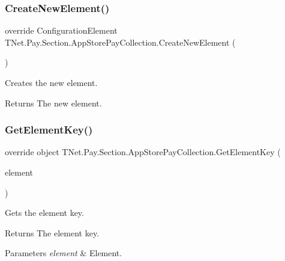 \subsubsection{\texorpdfstring{Create\+New\+Element()}{CreateNewElement()}}
{\footnotesize\ttfamily override Configuration\+Element T\+Net.\+Pay.\+Section.\+App\+Store\+Pay\+Collection.\+Create\+New\+Element (\begin{DoxyParamCaption}{ }\end{DoxyParamCaption})\hspace{0.3cm}{\ttfamily [protected]}}



Creates the new element. 

\begin{DoxyReturn}{Returns}
The new element.
\end{DoxyReturn}
\mbox{\label{class_t_net_1_1_pay_1_1_section_1_1_app_store_pay_collection_a2009b8860cf11f12d439bd89bd09663a}} 
\subsubsection{\texorpdfstring{Get\+Element\+Key()}{GetElementKey()}}
{\footnotesize\ttfamily override object T\+Net.\+Pay.\+Section.\+App\+Store\+Pay\+Collection.\+Get\+Element\+Key (\begin{DoxyParamCaption}\item[{Configuration\+Element}]{element }\end{DoxyParamCaption})\hspace{0.3cm}{\ttfamily [protected]}}



Gets the element key. 

\begin{DoxyReturn}{Returns}
The element key.
\end{DoxyReturn}

\begin{DoxyParams}{Parameters}
{\em element} & Element.\\
\hline
\end{DoxyParams}


